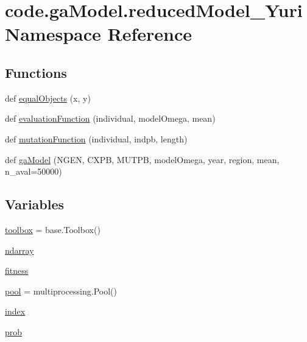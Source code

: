 \hypertarget{namespacecode_1_1ga_model_1_1reduced_model___yuri}{}\section{code.\+ga\+Model.\+reduced\+Model\+\_\+\+Yuri Namespace Reference}
\label{namespacecode_1_1ga_model_1_1reduced_model___yuri}
\subsection*{Functions}
\begin{DoxyCompactItemize}
\item 
def \hyperlink{namespacecode_1_1ga_model_1_1reduced_model___yuri_ae7bad5e83a55b1cf2866cf0ba552a6e5}{equal\+Objects} (x, y)
\item 
def \hyperlink{namespacecode_1_1ga_model_1_1reduced_model___yuri_a8260255d22c11bcb56267899e732bb25}{evaluation\+Function} (individual, model\+Omega, mean)
\item 
def \hyperlink{namespacecode_1_1ga_model_1_1reduced_model___yuri_a7c2776b17691500596d78ef2fa34cee9}{mutation\+Function} (individual, indpb, length)
\item 
def \hyperlink{namespacecode_1_1ga_model_1_1reduced_model___yuri_a8122076cc02bd20a75442fe3231de4b4}{ga\+Model} (N\+G\+EN, C\+X\+PB, M\+U\+T\+PB, model\+Omega, year, region, mean, n\+\_\+aval=50000)
\end{DoxyCompactItemize}
\subsection*{Variables}
\begin{DoxyCompactItemize}
\item 
\hyperlink{namespacecode_1_1ga_model_1_1reduced_model___yuri_ad9761943e77a96a38cbdeb410b2344aa}{toolbox} = base.\+Toolbox()
\item 
\hyperlink{namespacecode_1_1ga_model_1_1reduced_model___yuri_abfbab5bb7a845a1ce6e9b7286b0119ab}{ndarray}
\item 
\hyperlink{namespacecode_1_1ga_model_1_1reduced_model___yuri_acf335d8330ee303ad3fb0eef5943ebcd}{fitness}
\item 
\hyperlink{namespacecode_1_1ga_model_1_1reduced_model___yuri_a294764fd71c26599a42af686a36851a7}{pool} = multiprocessing.\+Pool()
\item 
\hyperlink{namespacecode_1_1ga_model_1_1reduced_model___yuri_a45d8e7477fd825ec883e666f62c7adb8}{index}
\item 
\hyperlink{namespacecode_1_1ga_model_1_1reduced_model___yuri_a1e6723a22f2d3cdf04cb44218b7eb745}{prob}
\end{DoxyCompactItemize}


